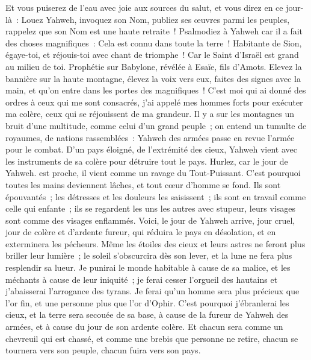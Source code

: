 \begin{multicols}{2}
Et vous puiserez de l'eau avec joie aux sources du salut,
et vous direz en ce jour-là~: Louez Yahweh, invoquez son Nom, publiez ses œuvres parmi les peuples, rappelez que son Nom est une haute retraite~!
Psalmodiez à Yahweh car il a fait des choses magnifiques~: Cela est connu dans toute la terre~!
Habitante de Sion, égaye-toi, et réjouis-toi avec chant de triomphe~! Car le Saint d'Israël est grand au milieu de toi.
\VerseOne{}Prophétie sur Babylone, révélée à Esaïe, fils d'Amots.
Elevez la bannière sur la haute montagne, élevez la voix vers eux, faites des signes avec la main, et qu'on entre dans les portes des magnifiques~!
C'est moi qui ai donné des ordres à ceux qui me sont consacrés, j'ai appelé mes hommes forts pour exécuter ma colère, ceux qui se réjouissent de ma grandeur.
Il y a sur les montagnes un bruit d'une multitude, comme celui d'un grand peuple~; on entend un tumulte de royaumes, de nations rassemblées~: Yahweh des armées passe en revue l'armée pour le combat.
D'un pays éloigné, de l'extrémité des cieux, Yahweh vient avec les instruments de sa colère pour détruire tout le pays.
Hurlez, car le jour de Yahweh. est proche, il vient comme un ravage du Tout-Puissant.
C'est pourquoi toutes les mains deviennent lâches, et tout cœur d'homme se fond.
Ils sont épouvantés~; les détresses et les douleurs les saisissent~; ils sont en travail comme celle qui enfante~; ils se regardent les uns les autres avec stupeur, leurs visages sont comme des visages enflammés.
Voici, le jour de Yahweh arrive, jour cruel, jour de colère et d'ardente fureur, qui réduira le pays en désolation, et en exterminera les pécheurs.
Même les étoiles des cieux et leurs astres ne feront plus briller leur lumière~; le soleil s'obscurcira dès son lever, et la lune ne fera plus resplendir sa lueur.
Je punirai le monde habitable à cause de sa malice, et les méchants à cause de leur iniquité~; je ferai cesser l'orgueil des hautains et j'abaisserai l'arrogance des tyrans.
Je ferai qu'un homme sera plus précieux que l'or fin, et une personne plus que l'or d'Ophir.
C'est pourquoi j'ébranlerai les cieux, et la terre sera secouée de sa base, à cause de la fureur de Yahweh des armées, et à cause du jour de son ardente colère.
Et chacun sera comme un chevreuil qui est chassé, et comme une brebis que personne ne retire, chacun se tournera vers son peuple, chacun fuira vers son pays.

\end{multicols}
